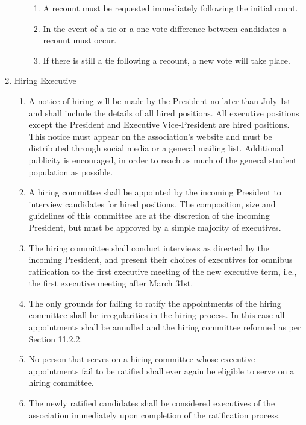 \documentclass[12pt,a4paper]{article}
\begin{document}
\begin{enumerate}
\begin{enumerate}
\begin{enumerate}
\item A recount must be requested immediately following the initial count.

\item In the event of a tie or a one vote difference between candidates a recount must occur.

\item If there is still a tie following a recount, a new vote will take place.
\end{enumerate}
\end{enumerate}

\item Hiring Executive

\begin{enumerate}
\item A notice of hiring will be made by the President no later than July 1st and shall include the details of all hired positions. All executive positions except the President and Executive Vice-President are hired positions. This notice must appear on the association's website and must be distributed through social media or a general mailing list. Additional publicity is encouraged, in order to reach as much of the general student population as possible.

\item A hiring committee shall be appointed by the incoming President to interview candidates for hired positions. The composition, size and guidelines of this committee are at the discretion of the incoming President, but must be approved by a simple majority of executives.

\item The hiring committee shall conduct interviews as directed by the incoming President, and present their choices of executives for omnibus ratification to the first executive meeting of the new executive term, i.e., the first executive meeting after March 31st.

\item The only grounds for failing to ratify the appointments of the hiring committee shall be irregularities in the hiring process. In this case all appointments shall be annulled and the hiring committee reformed as per Section 11.2.2.

\item No person that serves on a hiring committee whose executive appointments fail to be ratified shall ever again be eligible to serve on a hiring committee.

\item The newly ratified candidates shall be considered executives of the association immediately upon completion of the ratification process.
\end{enumerate}


\end{enumerate}
\end{document}
